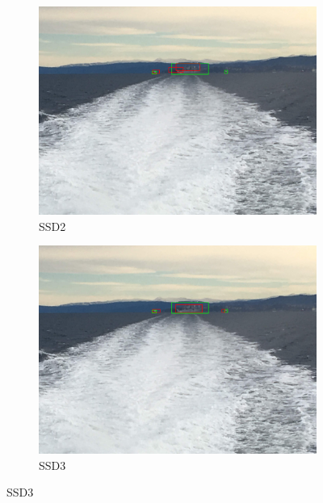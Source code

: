 \begin{figure}[h!]
\begin{subfigure}{.5\textwidth}
  \centering
  \includegraphics[width=0.8\linewidth]{results/case_buildings/ssdtrf/ssd2/3better/IMG_2350.jpg}
  \caption{SSD2}
\end{subfigure}%
\begin{subfigure}{.5\textwidth}
  \centering
  \includegraphics[width=.8\linewidth]{results/case_buildings/ssdtrf/ssd3/3better/IMG_2350.jpg}
  \caption{SSD3}
\end{subfigure}


\end{figure}
